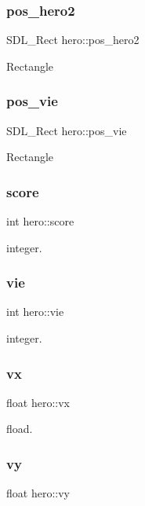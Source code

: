 \subsubsection{\texorpdfstring{pos\+\_\+hero2}{pos\_hero2}}
{\footnotesize\ttfamily S\+D\+L\+\_\+\+Rect hero\+::pos\+\_\+hero2}

Rectangle \mbox{\label{structhero_adbe4f5c90c7c4d99292c65d50dad02b7}} 
\subsubsection{\texorpdfstring{pos\+\_\+vie}{pos\_vie}}
{\footnotesize\ttfamily S\+D\+L\+\_\+\+Rect hero\+::pos\+\_\+vie}

Rectangle \mbox{\label{structhero_ad95606e4c167095066a7d314620d99b5}} 
\subsubsection{\texorpdfstring{score}{score}}
{\footnotesize\ttfamily int hero\+::score}

integer. \mbox{\label{structhero_a5887140c26217e8f45870ee09224ff94}} 
\subsubsection{\texorpdfstring{vie}{vie}}
{\footnotesize\ttfamily int hero\+::vie}

integer. \mbox{\label{structhero_a79f3a7c2bf2a8e40bc1840c4bc0502a7}} 
\subsubsection{\texorpdfstring{vx}{vx}}
{\footnotesize\ttfamily float hero\+::vx}

fload. \mbox{\label{structhero_ac9881c9f77d187cba2636f7ed355cb1a}} 
\subsubsection{\texorpdfstring{vy}{vy}}
{\footnotesize\ttfamily float hero\+::vy}

